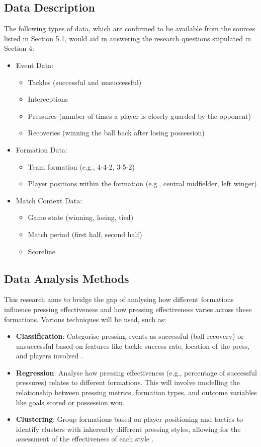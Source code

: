 \documentclass[12pt]{article}
\begin{document}
\subsection{Data Description}
The following types of data, which are confirmed to be available from the sources listed in Section 5.1, would aid in answering the research questions stipulated in Section 4:
\begin{itemize}
    \item Event Data:
    \begin{itemize}
        \item Tackles (successful and unsuccessful)
        \item Interceptions
        \item Pressures (number of times a player is closely guarded by the opponent)
        \item Recoveries (winning the ball back after losing possession)
    \end{itemize}
    \item Formation Data:
    \begin{itemize}
        \item Team formation (e.g., 4-4-2, 3-5-2)
        \item Player positions within the formation (e.g., central midfielder, left winger)
    \end{itemize}
    \item Match Context Data:
    \begin{itemize}
        \item Game state (winning, losing, tied)
        \item Match period (first half, second half)
        \item Scoreline
    \end{itemize}
\end{itemize}

\subsection{Data Analysis Methods}
This research aims to bridge the gap of analysing how different formations influence pressing effectiveness and how pressing effectiveness varies across these formations. Various techniques will be used, such as:
\begin{itemize}
    \item \textbf{Classification}: Categorise pressing events as successful (ball recovery) or unsuccessful based on features like tackle success rate, location of the press, and players involved \citep{forcher_keys_2022}.
    \item \textbf{Regression}: Analyse how pressing effectiveness (e.g., percentage of successful pressures) relates to different formations. This will involve modelling the relationship between pressing metrics, formation types, and outcome variables like goals scored or possession won.
    \item \textbf{Clustering}: Group formations based on player positioning and tactics to identify clusters with inherently different pressing styles, allowing for the assessment of the effectiveness of each style \citep{merhej_what_2021}.
\end{itemize}
\end{document}
